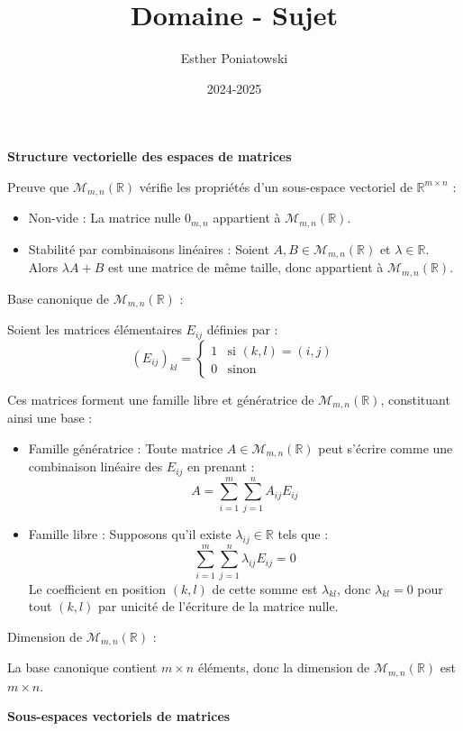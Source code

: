 \documentclass[10pt,a4paper]{article}
\title{Domaine - Sujet}
\author{Esther Poniatowski}
\date{2024-2025}
\begin{document}
\textbf{Structure vectorielle des espaces de matrices}

\q Preuve que $\mathcal{M}_{m,n}(\mathbb{R})$ vérifie les propriétés d'un sous-espace vectoriel de
$\mathbb{R}^{m \times n}$ :

\begin{itemize}
    \item Non-vide : La matrice nulle $0_{m,n}$ appartient à $\mathcal{M}_{m,n}(\mathbb{R})$.
    \item Stabilité par combinaisons linéaires : Soient $A, B \in \mathcal{M}_{m,n}(\mathbb{R})$ et
    $\lambda \in \mathbb{R}$. Alors $\lambda A + B$ est une matrice de même taille, donc appartient
    à $\mathcal{M}_{m,n}(\mathbb{R})$.
\end{itemize}

\q Base canonique de $\mathcal{M}_{m,n}(\mathbb{R})$ :

Soient les matrices élémentaires $E_{ij}$ définies par :
\[ (E_{ij})_{kl} = \begin{cases} 1 & \text{si } (k,l) = (i,j) \\ 0 & \text{sinon} \end{cases} \]

Ces matrices forment une famille libre et génératrice de $\mathcal{M}_{m,n}(\mathbb{R})$,
constituant ainsi une base :
\begin{itemize}
    \item Famille génératrice : Toute matrice $A \in \mathcal{M}_{m,n}(\mathbb{R})$ peut s'écrire
    comme une combinaison linéaire des $E_{ij}$ en prenant : $$A = \sum_{i=1}^m \sum_{j=1}^n A_{ij}
    E_{ij}$$
    \item Famille libre : Supposons qu'il existe $\lambda_{ij} \in \mathbb{R}$ tels que :
    $$\sum_{i=1}^m \sum_{j=1}^n \lambda_{ij} E_{ij} = 0$$
    Le coefficient en position $(k,l)$ de cette somme est $\lambda_{kl}$, donc $\lambda_{kl} = 0$
    pour tout $(k,l)$ par unicité de l'écriture de la matrice nulle.
\end{itemize}


\q Dimension de $\mathcal{M}_{m,n}(\mathbb{R})$ :

La base canonique contient $m \times n$ éléments, donc la dimension de
$\mathcal{M}_{m,n}(\mathbb{R})$ est $m \times n$.

\bigskip
\textbf{Sous-espaces vectoriels de matrices}
\end{document}
